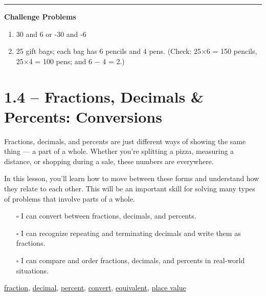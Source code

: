 \documentclass[
  letterpaper,
  DIV=11,
  numbers=noendperiod]{scrreprt}
\providecommand{\tightlist}{%
  \setlength{\itemsep}{0pt}\setlength{\parskip}{0pt}}
\begin{document}
\begin{center}\rule{0.5\linewidth}{0.5pt}\end{center}

\textbf{Challenge Problems}

\begin{enumerate}
\def\labelenumi{\arabic{enumi}.}
\setcounter{enumi}{8}
\item
  30 and 6 or -30 and -6
\item
  25 gift bags; each bag has 6 pencils and 4 pens. (Check: 25×6 = 150
  pencils, 25×4 = 100 pens; and 6 − 4 = 2.)
\end{enumerate}

\chapter*{1.4 -- Fractions, Decimals \& Percents:
Conversions}\label{fractions-decimals-percents-conversions}


Fractions, decimals, and percents are just different ways of showing the
same thing --- a part of a whole. Whether you're splitting a pizza,
measuring a distance, or shopping during a sale, these numbers are
everywhere.

In this lesson, you'll learn how to move between these forms and
understand how they relate to each other. This will be an important
skill for solving many types of problems that involve parts of a whole.

\begin{itemize}
\tightlist
\item[$\square$]
  I can convert between fractions, decimals, and percents.
\item[$\square$]
  I can recognize repeating and terminating decimals and write them as
  fractions.
\item[$\square$]
  I can compare and order fractions, decimals, and percents in
  real-world situations.
\end{itemize}

\href{./glossary.html\#glossary-fraction}{fraction},
\href{./glossary.html\#glossary-decimal}{decimal},
\href{./glossary.html\#glossary-percent}{percent},
\href{./glossary.html\#glossary-convert}{convert},
\href{./glossary.html\#glossary-equivalent}{equivalent},
\href{./glossary.html\#glossary-place-value}{place value}
\end{document}
